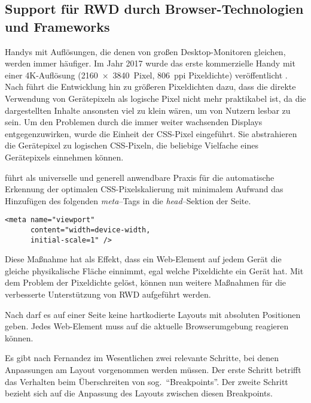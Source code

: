 
\subsection{Support für RWD durch Browser-Technologien und Frameworks}

Handys mit Auflösungen, die denen von großen Desktop-Monitoren gleichen, werden immer häufiger.
Im Jahr 2017 wurde das erste kommerzielle Handy mit einer 4K-Auflösung (2160 × 3840 Pixel, 806 ppi Pixeldichte) veröffentlicht \autocite{Wikipedia.SonyXperiaZ5Premium.2024}.
Nach \autocite{Harmsen.2018} führt die Entwicklung hin zu größeren Pixeldichten dazu, dass die direkte Verwendung von Gerätepixeln als logische Pixel nicht mehr praktikabel ist, da die dargestellten Inhalte ansonsten viel zu klein wären, um von Nutzern lesbar zu sein.
Um den Problemen durch die immer weiter wachsenden Displays entgegenzuwirken, wurde die Einheit der CSS-Pixel eingeführt.
Sie abstrahieren die Gerätepixel zu logischen CSS-Pixeln, die beliebige Vielfache eines Gerätepixels einnehmen können.

\autocite{JiangResponsiveWebDesignModeAndApplication.2014} führt als universelle und generell anwendbare Praxis für die automatische Erkennung der optimalen CSS-Pixelskalierung mit minimalem Aufwand das Hinzufügen des folgenden \emph{meta}--Tags in die \emph{head}--Sektion der Seite.

\begin{verbatim}
<meta name="viewport"
      content="width=device-width,
      initial-scale=1" />
\end{verbatim}

Diese Maßnahme hat als Effekt, dass ein Web-Element auf jedem Gerät die gleiche physikalische Fläche einnimmt, egal welche Pixeldichte ein Gerät hat.
Mit dem Problem der Pixeldichte gelöst, können nun weitere Maßnahmen für die verbesserte Unterstützung von RWD aufgeführt werden.

Nach \autocite{Katajisto.CreatingSupportContent.2015} darf es auf einer Seite keine hartkodierte Layouts mit absoluten Positionen geben.
Jedes Web-Element muss auf die aktuelle Browserumgebung reagieren können.

Es gibt nach Fernandez \autocite[S. 3]{MobileWebResponsiveWebdesign.Fernandez.2012} im Wesentlichen zwei relevante Schritte, bei denen Anpassungen am Layout vorgenommen werden müssen.
Der erste Schritt betrifft das Verhalten beim Überschreiten von sog.\ "`Breakpoints"'.
Der zweite Schritt bezieht sich auf die Anpassung des Layouts zwischen diesen Breakpoints.

